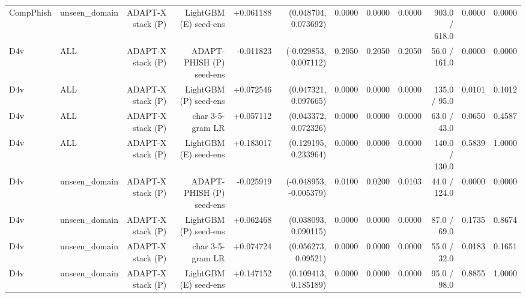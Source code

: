 \begin{table}[t]
\begin{tabular}{llrrrrrrrrrr}
CompPhish & unseen\_domain & ADAPT-X stack (P) & LightGBM (E) seed-ens & +0.061188 & (0.048704, 0.073692) & 0.0000 & 0.0000 & 0.0000 & 903.0 / 618.0 & 0.0000 & 0.0000 \\
D4v & ALL & ADAPT-X stack (P) & ADAPT-PHISH (P) seed-ens & -0.011823 & (-0.029853, 0.007112) & 0.2050 & 0.2050 & 0.2050 & 56.0 / 161.0 & 0.0000 & 0.0000 \\
D4v & ALL & ADAPT-X stack (P) & LightGBM (P) seed-ens & +0.072546 & (0.047321, 0.097665) & 0.0000 & 0.0000 & 0.0000 & 135.0 / 95.0 & 0.0101 & 0.1012 \\
D4v & ALL & ADAPT-X stack (P) & char 3-5-gram LR & +0.057112 & (0.043372, 0.072326) & 0.0000 & 0.0000 & 0.0000 & 63.0 / 43.0 & 0.0650 & 0.4587 \\
D4v & ALL & ADAPT-X stack (P) & LightGBM (E) seed-ens & +0.183017 & (0.129195, 0.233964) & 0.0000 & 0.0000 & 0.0000 & 140.0 / 130.0 & 0.5839 & 1.0000 \\
D4v & unseen\_domain & ADAPT-X stack (P) & ADAPT-PHISH (P) seed-ens & -0.025919 & (-0.048953, -0.005379) & 0.0100 & 0.0200 & 0.0103 & 44.0 / 124.0 & 0.0000 & 0.0000 \\
D4v & unseen\_domain & ADAPT-X stack (P) & LightGBM (P) seed-ens & +0.062468 & (0.038093, 0.090115) & 0.0000 & 0.0000 & 0.0000 & 87.0 / 69.0 & 0.1735 & 0.8674 \\
D4v & unseen\_domain & ADAPT-X stack (P) & char 3-5-gram LR & +0.074724 & (0.056273, 0.09521) & 0.0000 & 0.0000 & 0.0000 & 55.0 / 32.0 & 0.0183 & 0.1651 \\
D4v & unseen\_domain & ADAPT-X stack (P) & LightGBM (E) seed-ens & +0.147152 & (0.109413, 0.185189) & 0.0000 & 0.0000 & 0.0000 & 95.0 / 98.0 & 0.8855 & 1.0000 \\
\bottomrule
\end{tabular}
\end{table}